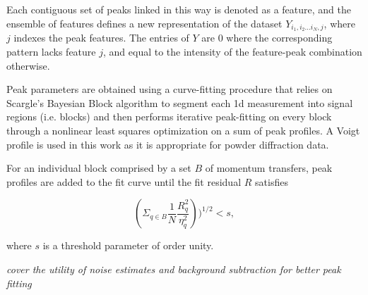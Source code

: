 \documentclass[12pt]{iopart}
\begin{document}
Each contiguous set of peaks linked in this way is denoted as a feature,
and the ensemble of features defines a new representation of the dataset
$ Y_{i_1,i_2...i_N, j} $, where $j$ indexes the peak features. The
entries of $Y$ are 0 where the corresponding pattern lacks feature $j$,
and equal to the intensity of the feature-peak combination otherwise.

Peak parameters are obtained using a curve-fitting procedure that
relies on Scargle's Bayesian Block algorithm to segment each 1d
measurement into signal regions (i.e. blocks) and then performs
iterative peak-fitting on every block through a nonlinear least squares
optimization on a sum of peak profiles. A Voigt profile is used in this
work as it is appropriate for powder diffraction data.

For an individual block comprised by a set $B$ of momentum transfers,
peak profiles are added to the fit curve until the fit residual $R$
satisfies

\begin{equation}
(\Sigma_{q \in B}\frac{1}{N}\frac{R_q^2}{\eta_{q}^2}))^{1 / 2}  < s,
\end{equation}

where $s$ is a threshold parameter of order unity.%

\emph{cover the utility of noise estimates and background subtraction for better peak fitting}
\end{document}
